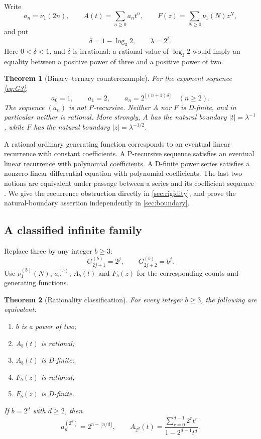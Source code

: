 \documentclass[11pt,letterpaper]{article}
\numberwithin{equation}{section}
\newtheorem{theorem}{Theorem}[section]
\theoremstyle{definition}
\theoremstyle{remark}
\begin{document}
Write
\[
 a_n=\nu_1(2n),\qquad A(t)=\sum_{n\ge0}a_n t^n,
 \qquad F(z)=\sum_{N\ge0}\nu_1(N)z^N,
\]
and put
\begin{equation}\label{eq:delta}
 \delta=1-\log_3 2,\qquad \lambda=2^\delta.
\end{equation}
Here $0<\delta<1$, and $\delta$ is irrational: a rational value of $\log_3 2$ would imply an equality between a positive power of three and a positive power of two.

\begin{theorem}[Binary--ternary counterexample]\label{thm:main}
For the exponent sequence \eqref{eq:G3},
\begin{equation}\label{eq:floorformula}
 a_0=1,\qquad a_1=2,\qquad
 a_n=2^{\lfloor(n+1)\delta\rfloor}\quad(n\ge2).
\end{equation}
The sequence $(a_n)$ is not P-recursive. Neither $A$ nor $F$ is D-finite, and in particular neither is rational. More strongly, $A$ has the natural boundary $|t|=\lambda^{-1}$, while $F$ has the natural boundary $|z|=\lambda^{-1/2}$.
\end{theorem}

A rational ordinary generating function corresponds to an eventual linear recurrence with constant coefficients. A P-recursive sequence satisfies an eventual linear recurrence with polynomial coefficients. A D-finite power series satisfies a nonzero linear differential equation with polynomial coefficients. The last two notions are equivalent under passage between a series and its coefficient sequence \cite[Theorem~1.5]{StanleyDFinite}. We give the recurrence obstruction directly in \cref{sec:rigidity}, and prove the natural-boundary assertion independently in \cref{sec:boundary}.

\subsection{A classified infinite family}
Replace three by any integer $b\ge3$:
\begin{equation}\label{eq:Gb}
 G^{(b)}_{2j+1}=2^j,\qquad G^{(b)}_{2j+2}=b^j.
\end{equation}
Use $\nu^{(b)}_1(N)$, $a^{(b)}_n$, $A_b(t)$ and $F_b(z)$ for the corresponding counts and generating functions.

\begin{theorem}[Rationality classification]\label{thm:classification}
For every integer $b\ge3$, the following are equivalent:
\begin{enumerate}[label=(\roman*)]
\item $b$ is a power of two;
\item $A_b(t)$ is rational;
\item $A_b(t)$ is D-finite;
\item $F_b(z)$ is rational;
\item $F_b(z)$ is D-finite.
\end{enumerate}
If $b=2^d$ with $d\ge2$, then
\begin{equation}\label{eq:rationalfamily}
 a_n^{(2^d)}=2^{n-\lfloor n/d\rfloor},\qquad
 A_{2^d}(t)=\frac{\displaystyle\sum_{r=0}^{d-1}2^r t^r}
 {1-2^{d-1}t^d}.
\end{equation}
\end{theorem}
\end{document}
